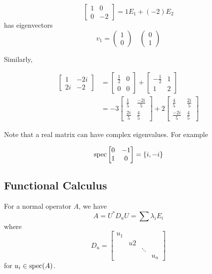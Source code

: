 \begin{example}
    \[\begin{bmatrix}1&0\\0&-2\end{bmatrix} = 1E_1 + (-2)E_2\]
    has eigenvectors
    \[v_1 = \begin{pmatrix}1\\0\end{pmatrix}\quad\begin{pmatrix}0\\1\end{pmatrix}\]

    Similarly,

    \begin{align*}\begin{bmatrix}1&-2i\\2i&-2\end{bmatrix}
         & = \begin{bmatrix}\frac{1}{2}&0\\0&0\end{bmatrix}+\begin{bmatrix}-\frac{1}{2}&1\\1&2\end{bmatrix}      \\
         & = -3\begin{bmatrix}\frac{1}{5} & \frac{-2i}{5}\\\frac{2i}{5}&\frac{4}{5}\end{bmatrix} + 2\begin{bmatrix}\frac{4}{5} & \frac{2i}{5}\\\frac{-2i}{5}&\frac{4}{5}\end{bmatrix}
    \end{align*}
\end{example}

Note that a real matrix can have complex eigenvalues. For example

\[\operatorname{spec}\begin{bmatrix}0&-1\\1&0\end{bmatrix} = \left\lbrace i, -i\right\rbrace\]

\subsection{Functional Calculus}
For a normal operator $A$, we have
\[A = U^*D_u U = \sum \lambda_i E_i\]
where
\[D_u = \begin{bmatrix}
        u_1                  \\
         & u2                \\
         &    & \ddots       \\
         &    &        & u_n
    \end{bmatrix}\]
for $u_i \in \operatorname{spec}(A)$.

